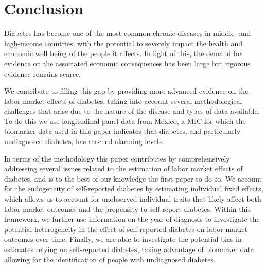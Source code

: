 \documentclass[12pt,english]{article}
\begin{document}
\section{\label{sec:Conclusion}Conclusion}

Diabetes has become one of the most common chronic diseases in middle- and high-income countries, with the potential to severely impact the health and economic well being of the people it affects.  In light of this, the demand for evidence on the associated economic consequences has been large but rigorous evidence remains scarce. 

We contribute to filling this gap by providing more advanced evidence on the labor market effects of diabetes, taking into account several methodological challenges that arise due to the nature of the disease and types of data available. To do this we use longitudinal panel data from Mexico, a \ac{MIC} for which the biomarker data used in this paper indicates that diabetes, and particularly undiagnosed diabetes, has reached alarming levels.

In terms of the methodology this paper contributes by comprehensively addressing several issues related to the estimation of labor market effects of diabetes, and is to the best of our knowledge the first paper to do so. We account for the endogeneity of self-reported diabetes by estimating individual fixed effects, which allows us to account for unobserved individual traits that likely affect both labor market outcomes and the propensity to self-report diabetes. Within this framework, we further use information on the year of diagnosis to investigate the potential heterogeneity in the effect of self-reported diabetes on labor market outcomes over time. Finally, we are able to investigate the potential bias in estimates relying on self-reported diabetes, taking advantage of biomarker data allowing for the identification of people with undiagnosed diabetes. 
\end{document}
